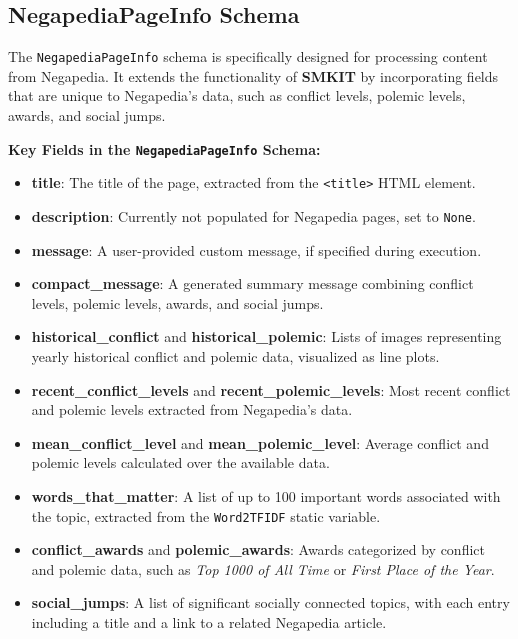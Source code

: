 \subsection{NegapediaPageInfo Schema}
\label{subsec:negapediapageinfo_schema}
The \texttt{NegapediaPageInfo} schema is specifically designed for processing content from Negapedia. It extends the functionality of \textbf{SMKIT} by incorporating fields that are unique to Negapedia’s data, such as conflict levels, polemic levels, awards, and social jumps.

\textbf{Key Fields in the \texttt{NegapediaPageInfo} Schema:}
\begin{itemize}
    \item \textbf{title}: The title of the page, extracted from the \texttt{<title>} HTML element.
    \item \textbf{description}: Currently not populated for Negapedia pages, set to \texttt{None}.
    \item \textbf{message}: A user-provided custom message, if specified during execution.
    \item \textbf{compact\_message}: A generated summary message combining conflict levels, polemic levels, awards, and social jumps.
    \item \textbf{historical\_conflict} and \textbf{historical\_polemic}: Lists of images representing yearly historical conflict and polemic data, visualized as line plots.
    \item \textbf{recent\_conflict\_levels} and \textbf{recent\_polemic\_levels}: Most recent conflict and polemic levels extracted from Negapedia's data.
    \item \textbf{mean\_conflict\_level} and \textbf{mean\_polemic\_level}: Average conflict and polemic levels calculated over the available data.
    \item \textbf{words\_that\_matter}: A list of up to 100 important words associated with the topic, extracted from the \texttt{Word2TFIDF} static variable.
    \item \textbf{conflict\_awards} and \textbf{polemic\_awards}: Awards categorized by conflict and polemic data, such as \textit{Top 1000 of All Time} or \textit{First Place of the Year}.
    \item \textbf{social\_jumps}: A list of significant socially connected topics, with each entry including a title and a link to a related Negapedia article.
\end{itemize}

